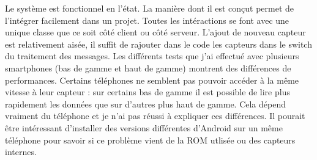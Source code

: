Le système est fonctionnel en l'état. La manière dont il est conçut permet de l'intégrer facilement dans un projet. Toutes les intéractions se font avec une unique classe que ce soit côté client ou côté serveur. L'ajout de nouveau capteur est relativement aisée, il suffit de rajouter dans le code les capteurs dans le switch du traitement des messages. 
Les différents tests que j'ai effectué avec plusieurs smartphones (bas de gamme et haut de gamme) montrent des différences de performances. Certains téléphones ne semblent pas pouvoir accéder à la même vitesse à leur capteur : sur certains bas de gamme il est possible de lire plus rapidement les données que sur d'autres plus haut de gamme. Cela dépend vraiment du téléphone et je n'ai pas réussi à expliquer ces différences. Il pourait être intéressant d'installer des versions différentes d'Android sur un même téléphone pour savoir si ce problème vient de la ROM utlisée ou des capteurs internes.